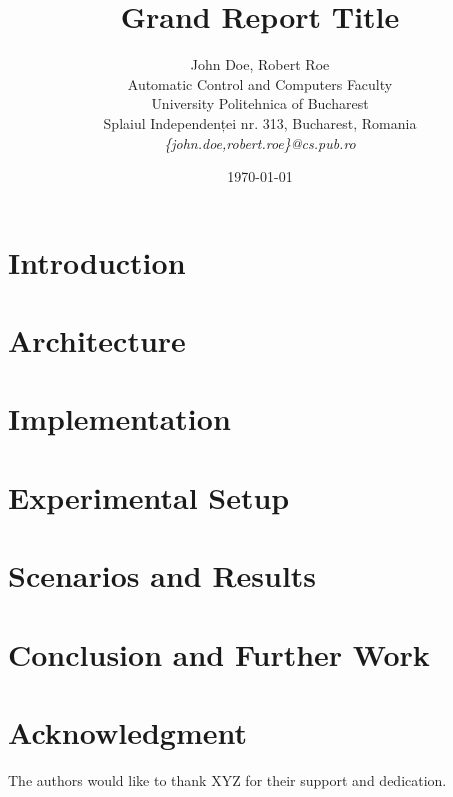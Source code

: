 \documentclass[12pt]{article}
\title{Grand Report Title}
\author{John Doe, Robert Roe\\
Automatic Control and Computers Faculty\\
University Politehnica of Bucharest\\
Splaiul Independenței nr. 313, Bucharest, Romania \\
\emph{\{john.doe,robert.roe\}@cs.pub.ro}}
\date{\today}
\begin{document}
\maketitle

\begin{abstract}

\end{abstract}

\section{Introduction}
\label{sec:introduction}


\section{Architecture}
\label{sec:architecture}


\section{Implementation}
\label{sec:implementation}


\section{Experimental Setup}
\label{sec:setup}


\section{Scenarios and Results}
\label{sec:results}


\section{Conclusion and Further Work}
\label{sec:conclusion}


\section*{Acknowledgment}
\label{sec:acknowledgment}

The authors would like to thank XYZ for their support and dedication.



\end{document}
